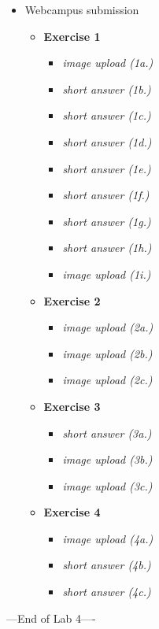 \documentclass[
]{article}
\providecommand{\tightlist}{%
  \setlength{\itemsep}{0pt}\setlength{\parskip}{0pt}}
\begin{document}
\begin{itemize}
\tightlist
\item
  Webcampus submission

  \begin{itemize}
  \tightlist
  \item
    \textbf{Exercise 1}

    \begin{itemize}
    \tightlist
    \item
      \emph{image upload (1a.)}\\
    \item
      \emph{short answer (1b.)}\\
    \item
      \emph{short answer (1c.)}
    \item
      \emph{short answer (1d.)}
    \item
      \emph{short answer (1e.)}
    \item
      \emph{short answer (1f.)}
    \item
      \emph{short answer (1g.)}
    \item
      \emph{short answer (1h.)}
    \item
      \emph{image upload (1i.)}
    \end{itemize}
  \item
    \textbf{Exercise 2}

    \begin{itemize}
    \tightlist
    \item
      \emph{image upload (2a.)}
    \item
      \emph{image upload (2b.)}
    \item
      \emph{image upload (2c.)}
    \end{itemize}
  \item
    \textbf{Exercise 3}

    \begin{itemize}
    \tightlist
    \item
      \emph{short answer (3a.)}
    \item
      \emph{image upload (3b.)}
    \item
      \emph{image upload (3c.)}
    \end{itemize}
  \item
    \textbf{Exercise 4}

    \begin{itemize}
    \tightlist
    \item
      \emph{image upload (4a.)}
    \item
      \emph{short answer (4b.)}
    \item
      \emph{short answer (4c.)}
    \end{itemize}
  \end{itemize}
\end{itemize}

---End of Lab 4----
\end{document}
